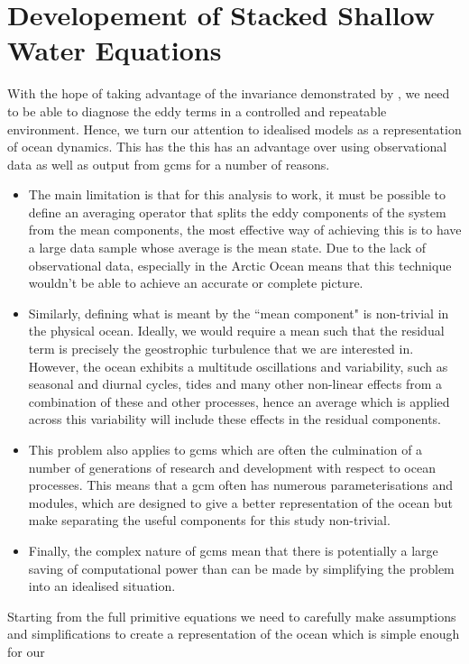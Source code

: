 \documentclass[10pt,a4paper]{article}
\begin{document}
\section{Developement of Stacked Shallow Water Equations}

With the hope of taking advantage of the invariance demonstrated by 
\cite{maddison2013eliassen}, we need to be able to diagnose the
eddy terms in a controlled and repeatable environment. Hence, we turn our attention to
idealised models as a representation of ocean dynamics. This has the this has an advantage 
over using observational data as well as output from \glspl{gcm} for a number of reasons.
\begin{itemize}
	\item The main limitation is that for this analysis to work, it must be possible to define an
	averaging operator that splits the eddy components of the system from the mean
	components, the most effective way of achieving this is to have a large data sample
	whose average is the mean state. Due to the lack of observational data, especially in the
	Arctic Ocean means that this  technique wouldn't be able to achieve an accurate or complete
	picture. 
	\item Similarly, defining what is meant by the ``mean component" is non-trivial in the physical ocean. Ideally, we would require a mean such that the residual term is precisely the 
	geostrophic turbulence that we are interested in. However, the ocean exhibits a multitude 
	oscillations and variability, such as seasonal and diurnal cycles, tides and many other
	non-linear effects from a combination of these and other processes, hence an average which
	is applied across this variability will include these effects in the residual components.
	\item This problem also applies to \glspl{gcm} which are often the culmination of 
	a number of generations of research and development with respect to ocean processes.
	This means that a \gls{gcm} often has numerous parameterisations and modules, which are
	designed to give a better representation of the ocean but make separating the useful components
	for this study non-trivial. 
	\item Finally, the complex nature of \glspl{gcm} mean that there is potentially a large saving
	of computational power than can be made by simplifying the problem into an idealised situation.
\end{itemize}
Starting from the full primitive equations we need to carefully make assumptions and
simplifications to create a representation of the ocean which is simple enough for our
\end{document}
